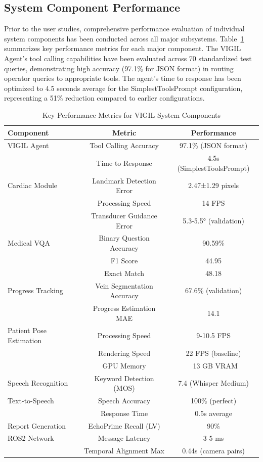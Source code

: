 \documentclass[12pt,a4paper]{article}
\begin{document}
\subsection{System Component Performance}

Prior to the user studies, comprehensive performance evaluation of individual system components has been conducted across all major subsystems. Table~\ref{tab:component_performance} summarizes key performance metrics for each major component. The VIGIL Agent's tool calling capabilities have been evaluated across 70 standardized test queries, demonstrating high accuracy (97.1\% for JSON format) in routing operator queries to appropriate tools. The agent's time to response has been optimized to 4.5 seconds average for the SimplestToolsPrompt configuration, representing a 51\% reduction compared to earlier configurations.

\begin{table}[h]
\centering
\caption{Key Performance Metrics for VIGIL System Components}
\label{tab:component_performance}
\begin{tabular}{lcc}
\toprule
\textbf{Component} & \textbf{Metric} & \textbf{Performance} \\
\midrule
VIGIL Agent & Tool Calling Accuracy & 97.1\% (JSON format) \\
 & Time to Response & 4.5s (SimplestToolsPrompt) \\
\midrule
Cardiac Module & Landmark Detection Error & 2.47±1.29 pixels \\
 & Processing Speed & 14 FPS \\
 & Transducer Guidance Error & 5.3-5.5° (validation) \\
\midrule
Medical VQA & Binary Question Accuracy & 90.59\% \\
 & F1 Score & 44.95 \\
 & Exact Match & 48.18 \\
\midrule
Progress Tracking & Vein Segmentation Accuracy & 67.6\% (validation) \\
 & Progress Estimation MAE & 14.1 \\
\midrule
Patient Pose Estimation & Processing Speed & 9-10.5 FPS \\
 & Rendering Speed & 22 FPS (baseline) \\
 & GPU Memory & ~13 GB VRAM \\
\midrule
Speech Recognition & Keyword Detection (MOS) & 7.4 (Whisper Medium) \\
\midrule
Text-to-Speech & Speech Accuracy & 100\% (perfect) \\
 & Response Time & 0.5s average \\
\midrule
Report Generation & EchoPrime Recall (LV) & 90\% \\
\midrule
ROS2 Network & Message Latency & 3-5 ms \\
 & Temporal Alignment Max & 0.44s (camera pairs) \\
\bottomrule
\end{tabular}
\end{table}
\end{document}
